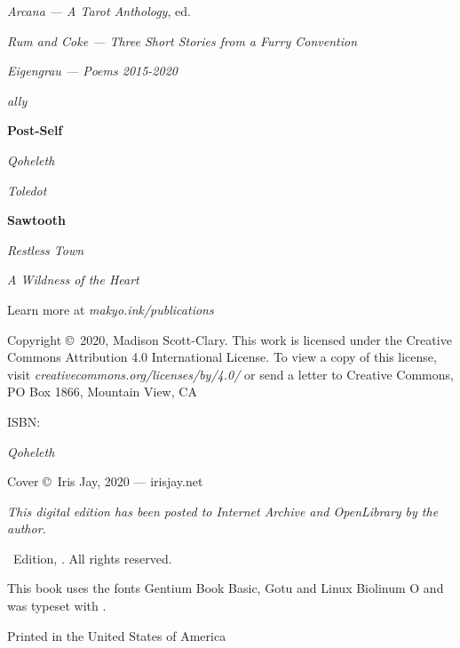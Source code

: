 \singlespacing
\thispagestyle{empty}
\begin{center}
    \TitleFamily

    \vspace{2ex}

    \emph{Arcana — A Tarot Anthology}, ed.

    \vspace{1ex}

    \emph{Rum and Coke — Three Short Stories from a Furry Convention}

    \vspace{1ex}

    \emph{Eigengrau — Poems 2015-2020}

    \vspace{1ex}

    \emph{ally}

    \vspace{2ex}
    
    \textbf{Post-Self}

    \emph{Qoheleth}

    \emph{Toledot}

    \vspace{2ex}

    \textbf{Sawtooth}

    \emph{Restless Town}

    \emph{A Wildness of the Heart}

    \vspace{2em}

    Learn more at \emph{makyo.ink/publications}
\end{center}
\vfill
\singlespacing
{\small\parindent0pt\parskip5pt
\noindent Copyright \copyright\ 2020, Madison Scott-Clary. This work is licensed under the Creative Commons Attribution 4.0 International License. To view a copy of this license, visit \mbox{\emph{creativecommons.org/licenses/by/4.0/}} or send a letter to Creative Commons, PO Box 1866, Mountain View, CA

\vspace{1ex}

ISBN: \ISBN

\vspace{1ex}

\textit{Qoheleth}

\vspace{1ex}

Cover \copyright\ Iris Jay, 2020 --- irisjay.net

\vspace{1ex}

\textit{This digital edition has been posted to Internet Archive and OpenLibrary by the author.}

\Edition\ Edition, \Year. All rights reserved.

\vspace{1ex}

This book uses the fonts Gentium Book Basic, {\DisplayFont Gotu} and {\TitleFont Linux Biolinum O} and was typeset with {\XeLaTeX}.

Printed in the United States of America\\
}%

\clearpage
